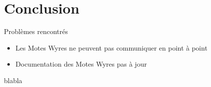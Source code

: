 \documentclass{beamer}
\begin{document}
\section{Conclusion}
\begin{frame}
	\begin{block}{Problèmes rencontrés}
		\begin{itemize}
			\item Les Motes Wyres ne peuvent pas communiquer en point à point
			\item Documentation des Motes Wyres pas à jour
		\end{itemize}
	\end{block}
\end{frame}

\begin{frame}
	\begin{block}{blabla}
		
	\end{block}
\end{frame}
\end{document}
